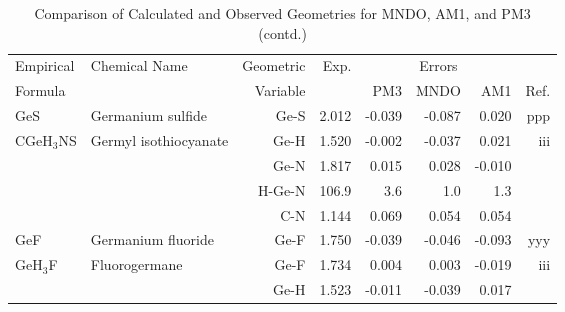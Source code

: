 \begin{table}
\begin{center}
\end{center}
\end{table}
\clearpage

\begin{table}
\caption{\label{geotabq}Comparison of Calculated and Observed Geometries for 
MNDO, AM1, and PM3 (contd.)}
\begin{center}
\compresstable
\begin{tabular}{llrrrrrr}
 Empirical  & Chemical Name &  Geometric &  Exp. & \multicolumn{3}{c}{Errors} & \\
  Formula   &               &  Variable &        & PM3  & MNDO  &  AM1 & Ref.\\
\hline
 GeS         & Germanium sulfide                  &Ge-S           &     2.012   &    -0.039 &    -0.087 &     0.020 &   ppp \\
 CGeH$_3$NS     & Germyl isothiocyanate              &Ge-H           &     1.520   &    -0.002 &    -0.037 &     0.021 &   iii \\
             &                                    &Ge-N           &     1.817   &     0.015 &     0.028 &    -0.010 &       \\
             &                                    &H-Ge-N       &     106.9   &       3.6 &       1.0 &       1.3   &       \\
             &                                    &C-N            &     1.144   &     0.069 &     0.054 &     0.054 &       \\
 GeF         & Germanium fluoride                 &Ge-F           &     1.750   &    -0.039 &    -0.046 &    -0.093 &   yyy \\
 GeH$_3$F       & Fluorogermane                      &Ge-F           &     1.734   &     0.004 &     0.003 &    -0.019 &   iii \\
             &                                    &Ge-H           &     1.523   &    -0.011 &    -0.039 &     0.017 &       \\

\end{tabular}
\end{center}
\end{table}

